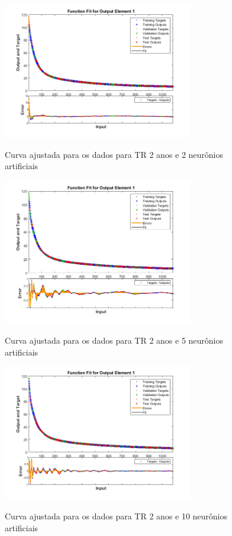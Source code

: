 \begin{figure}[h]
    \caption{Curva ajustada para os dados para TR 2 anos e 2 neurônios artificiais}
    \centering
    \includegraphics[width=0.74\textwidth]{Textuais/Figuras/NN/tr2-2neuronio.png}
    \label{fig:tr2-2n}
\end{figure}

\begin{figure}[h]
    \caption{Curva ajustada para os dados para TR 2 anos e 5 neurônios artificiais}
    \centering
    \includegraphics[width=0.74\textwidth]{Textuais/Figuras/NN/tr2-5neuronio.png}
    \label{fig:tr2-5n}
\end{figure}

\begin{figure}[h]
    \caption{Curva ajustada para os dados para TR 2 anos e 10 neurônios artificiais}
    \centering
    \includegraphics[width=0.74\textwidth]{Textuais/Figuras/NN/tr2-10neuronio.png}
    \label{fig:tr2-10n}
\end{figure}

